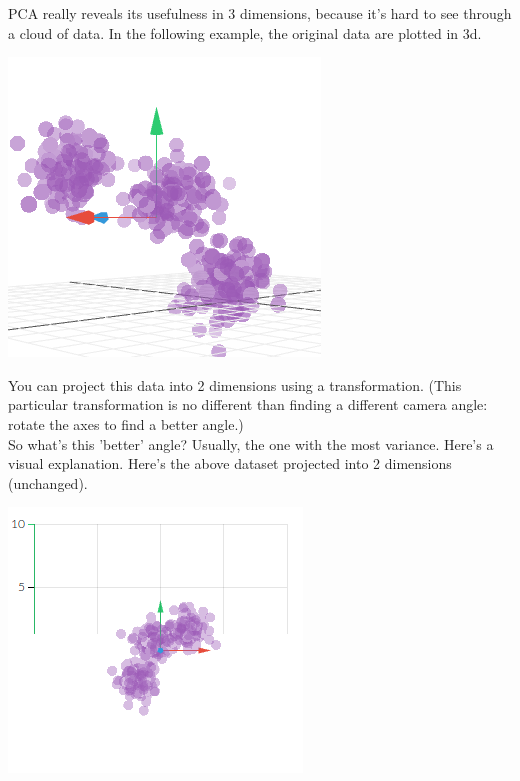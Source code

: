 \documentclass[english, 10pt]{article}
\begin{document}
PCA really reveals its usefulness in 3 dimensions, because it's hard to see through a cloud of data. In the following example, the original data are plotted in 3d.\\

{
\centering

\includegraphics[scale=0.65]{img/pca3dbefore.png} 

}

\hfill \break You can project this data into 2 dimensions using a transformation. (This particular transformation is no different than finding a different camera angle: rotate the axes to find a better angle.)\\

So what's this 'better' angle? Usually, the one with the most variance. Here's a visual explanation. Here's the above dataset projected into 2 dimensions (unchanged).\\

{
\centering

\includegraphics[scale=0.65]{img/pca2dbefore.png} 

}
\end{document}
